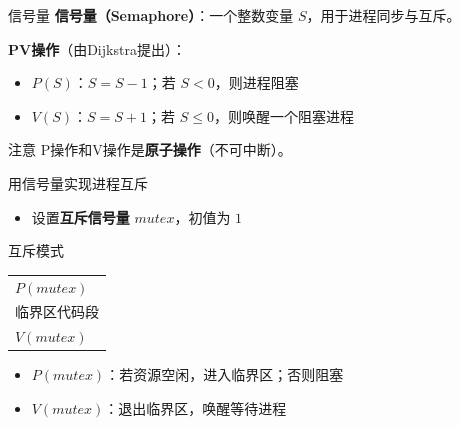 \documentclass[10pt, aspectratio=169]{beamer}
\begin{document}
\begin{frame}{信号量}
    \textbf{信号量（Semaphore）}：一个整数变量 $S$，用于进程同步与互斥。

    \vspace{0.5em}
    \textbf{PV操作}（由Dijkstra提出）：
    \begin{itemize}
        \item $P(S)$：$S = S - 1$；若 $S < 0$，则进程阻塞
        \item $V(S)$：$S = S + 1$；若 $S \le 0$，则唤醒一个阻塞进程
    \end{itemize}
    \vspace{0.5em}
    \begin{alertblock}{注意}
        P操作和V操作是\textbf{原子操作}（不可中断）。
    \end{alertblock}
\end{frame}

\begin{frame}{用信号量实现进程互斥}
    \begin{itemize}
        \item 设置\textbf{互斥信号量} $mutex$，初值为 $1$
    \end{itemize}
    \vspace{0.5em}
    \begin{block}{互斥模式}
        \begin{tabular}{l}
            $P(mutex)$ \\
            \qquad 临界区代码段 \\
            $V(mutex)$ \\
        \end{tabular}
    \end{block}
    \vspace{0.5em}
    \begin{itemize}
        \item $P(mutex)$：若资源空闲，进入临界区；否则阻塞
        \item $V(mutex)$：退出临界区，唤醒等待进程
    \end{itemize}
\end{frame}
\end{document}
